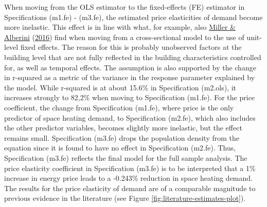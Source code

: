\documentclass[12pt,twoside]{reedthesis}
\begin{document}
When moving from the OLS estimator to the fixed-effects (FE) estimator in Specifications (m1.fe) - (m3.fe), the estimated price elasticities of demand become more inelastic. This effect is in line with what, for example, also \protect\hyperlink{ref-miller_alberini16}{Miller \& Alberini} (\protect\hyperlink{ref-miller_alberini16}{2016}) find when moving from a cross-sectional model to the use of unit-level fixed effects. The reason for this is probably unobserved factors at the building level that are not fully reflected in the building characteristics controlled for, as well as temporal effects. The assumption is also supported by the change in r-squared as a metric of the variance in the response parameter explained by the model. While r-squared is at about 15.6\% in Specification (m2.ols), it increases strongly to 82,2\% when moving to Specification (m1.fe). For the price coefficient, the change from Specification (m1.fe), where price is the only predictor of space heating demand, to Specification (m2.fe), which also includes the other predictor variables, becomes slightly more inelastic, but the effect remains small. Specification (m3.fe) drops the population density from the equation since it is found to have no effect in Specification (m2.fe). Thus, Specification (m3.fe) reflects the final model for the full sample analysis. The price elasticity coefficient in Specification (m3.fe) is to be interpreted that a 1\% increase in energy price leads to a -0.243\% reduction in space heating demand. The results for the price elasticity of demand are of a comparable magnitude to previous evidence in the literature (see Figure \ref{fig:literature-estimates-plot}).
\end{document}
